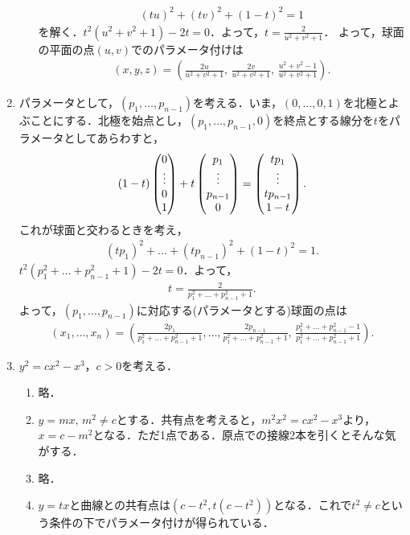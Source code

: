 \documentclass[9pt]{ltjsarticle}
\theoremstyle{break}
\theoremstyle{break}
\theoremstyle{break}
\theoremstyle{break}
\theoremstyle{break}
\theoremstyle{break}
\theoremstyle{break}
\theoremstyle{break}
\theoremstyle{break}
\theoremstyle{break}
\theoremstyle{break}
\theoremstyle{break}
\theoremstyle{break}
\theoremstyle{break}
\theoremstyle{break}
\theoremstyle{nonumberbreak}
\theoremstyle{nonumberbreak}
\begin{document}
\begin{enumerate}[label=(問題\arabic*)]
\begin{enumerate}[label=(\alph*)]
\begin{align}
 (tu)^2 + (tv)^2 + (1-t)^2 = 1
\end{align}
を解く．$t^2(u^2+v^2+1)-2t=0$．よって，$t=\frac{2}{u^2+v^2+1}$．
よって，球面の平面の点$(u,v)$でのパラメータ付けは
\begin{align}
 (x,y,z) = (\frac{2u}{u^2+v^2+1},\, \frac{2v}{u^2+v^2+1},\, \frac{u^2+v^2-1}{u^2+v^2+1}).
\end{align}
\end{enumerate}
 \item パラメータとして，$(p_1,\dots,p_{n-1})$を考える．いま，$(0,\dots,0,1)$を北極とよぶことにする．北極を始点とし，$(p_1,\dots,p_{n-1},0)$を終点とする線分を$t$をパラメータとしてあらわすと，
\begin{align}
 (1-t)\left(\begin{matrix} 0 \\ \vdots \\ 0 \\ 1 \end{matrix}\right) + t\left(\begin{matrix} p_1 \\ \vdots \\ p_{n-1}\\ 0 \end{matrix}\right) =
\left(\begin{matrix} tp_1 \\ \vdots \\ tp_{n-1} \\ 1-t \end{matrix}\right).
\end{align}
これが球面と交わるときを考え，
\begin{align}
 (tp_1)^2 + \dots + (tp_{n-1})^2 + (1-t)^2  = 1.
\end{align}
$t^2(p_1^2 + \dots + p_{n-1}^2 + 1) -2t = 0$．よって，
\begin{align}
 t = \frac{2}{p_1^2 + \dots + p_{n-1}^2 + 1}.
\end{align}
よって，$(p_1,\dots,p_{n-1})$に対応する(パラメータとする)球面の点は
\begin{align}
 (x_1,\dots,x_n) =
(\frac{2p_1}{p_1^2+\dots+p_{n-1}^2 + 1},\dots, \frac{2p_{n-1}}{p_1^2+\dots+p_{n-1}^2 + 1},\, \frac{p_1^2+\dots+p_{n-1}^2 - 1}{p_1^2+\dots+p_{n-1}^2 + 1}).
\end{align}
 \item $y^2=cx^2-x^3$，$c>0$を考える．
\begin{enumerate}[label=(\alph*)]
 \item 略．
 \item $y=mx,\, m^2 \neq c$とする．共有点を考えると，$m^2x^2 = cx^2 - x^3$より，
$x=c-m^2$となる．ただ1点である．原点での接線2本を引くとそんな気がする．
 \item 略．
 \item $y=tx$と曲線との共有点は$(c-t^2,t(c-t^2))$となる．これで$t^2\neq c$という条件の下でパラメータ付けが得られている．

\end{enumerate}
\end{enumerate}
\end{document}
